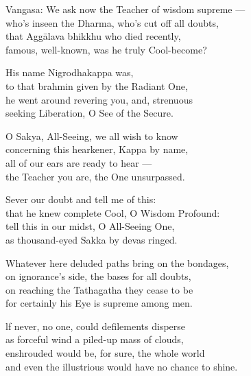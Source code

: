 \begin{MyDescription}{Vangasa:}
We ask now the Teacher of wisdom supreme —\\
who's inseen the Dharma, who's cut off all doubts,\\
that Agg\=alava bhikkhu who died recently,\\
famous, well-known, was he truly Cool-become?
\end{MyDescription}

\begin{MyDescription}{}
His name Nigrodhakappa was,\\
to that brahmin given by the Radiant One,\\
he went around revering you, and, strenuous\\
seeking Liberation, O See of the Secure.
\end{MyDescription}

\begin{MyDescription}{}
O Sakya, All-Seeing, we all wish to know\\
concerning this hearkener, Kappa by name,\\
all of our ears are ready to hear —\\
the Teacher you are, the One unsurpassed.
\end{MyDescription}

\begin{MyDescription}{}
Sever our doubt and tell me of this:\\
that he knew complete Cool, O Wisdom Profound:\\
tell this in our midst, O All-Seeing One,\\
as thousand-eyed Sakka by devas ringed.
\end{MyDescription}

\begin{MyDescription}{}
Whatever here deluded paths bring on the bondages,\\
on ignorance's side, the bases for all doubts,\\
on reaching the Tathagatha they cease to be\\
for certainly his Eye is supreme among men.
\end{MyDescription}

\begin{MyDescription}{}
lf never, no one, could deﬁlements disperse\\
as forceful wind a piled-up mass of clouds,\\
enshrouded would be, for sure, the whole world\\
and even the illustrious would have no chance to shine.
\end{MyDescription}

